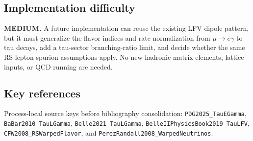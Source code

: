 \subsection*{Implementation difficulty}
\textbf{MEDIUM.}  A future implementation can reuse the existing LFV dipole
pattern, but it must generalize the flavor indices and rate normalization from
\(\mu\to e\gamma\) to tau decays, add a tau-sector branching-ratio limit, and
decide whether the same RS lepton-spurion assumptions apply.  No new hadronic
matrix elements, lattice inputs, or QCD running are needed.

\subsection*{Key references}
Process-local source keys before bibliography consolidation:
\texttt{PDG2025\_TauEGamma}, \texttt{BaBar2010\_TauLGamma},
\texttt{Belle2021\_TauLGamma}, \texttt{BelleIIPhysicsBook2019\_TauLFV},
\texttt{CFW2008\_RSWarpedFlavor}, and
\texttt{PerezRandall2008\_WarpedNeutrinos}.
